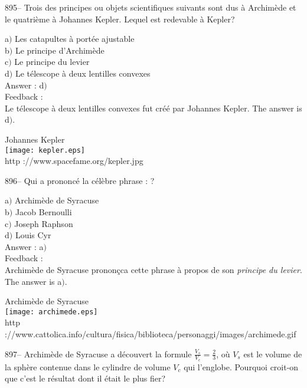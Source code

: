 ﻿\documentclass[letterpaper, 12pt]{article}
\begin{document}
895-- Trois des principes ou objets scientifiques suivants sont dus
\`a Archim\`ede et le quatri\`eme \`a Johannes Kepler. Lequel est
redevable \`a Kepler?

a$)$ Les catapultes \`a port\'ee ajustable\\
b$)$ Le principe d'Archim\`ede \\
c$)$ Le principe du levier \\
d$)$ Le t\'elescope \`a deux lentilles convexes \\

Answer : d$)$\\

Feedback : \\
Le t\'elescope \`a deux lentilles convexes fut cr\'e\'e par
Johannes Kepler. The answer is d$)$.\\

        \begin{center}
        Johannes Kepler\\
    \texttt{[image: kepler.eps]}\\
        {\footnotesize http ://www.spacefame.org/kepler.jpg}
    \end{center}

896-- Qui a prononc\'e la c\'el\`ebre phrase : \fg ?

a$)$ Archim\`ede de Syracuse\\
b$)$ Jacob Bernoulli \\
c$)$ Joseph Raphson \\
d$)$ Louis Cyr \\

Answer : a$)$\\

Feedback : \\
Archim\`ede de Syracuse pronon\c cca cette phrase \`a propos de son {\sl
principe du levier}. The answer is a$)$.\\

        \begin{center}
        Archim\`ede de Syracuse\\
    \texttt{[image: archimede.eps]}\\
        {\footnotesize http
://www.cattolica.info/cultura/fisica/biblioteca/personaggi/images/archimede.gif}
    \end{center}

897-- Archim\`ede de Syracuse a d\'ecouvert la formule
$\frac{V_s}{V_c}=\frac23$, o\`u $V_s$ est le volume de la sph\`ere
contenue dans le cylindre de volume $V_c$ qui l'englobe. Pourquoi
croit-on que c'est le r\'esultat dont il \'etait le plus fier?
\end{document}

